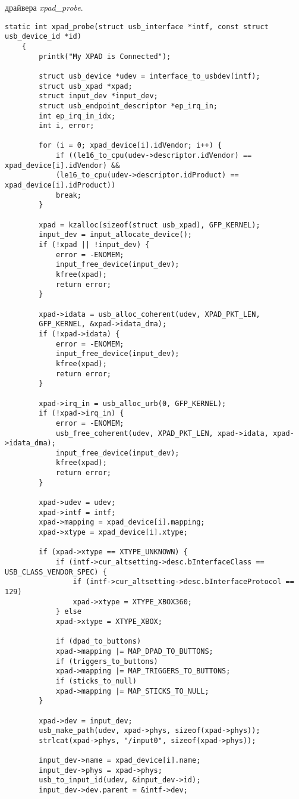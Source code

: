 драйвера \textit{xpad\_probe}.
\begin{lstlisting}[caption=Функция xpad\_probe]
	static int xpad_probe(struct usb_interface *intf, const struct usb_device_id *id)
	{
		printk("My XPAD is Connected");
		
		struct usb_device *udev = interface_to_usbdev(intf);
		struct usb_xpad *xpad;
		struct input_dev *input_dev;
		struct usb_endpoint_descriptor *ep_irq_in;
		int ep_irq_in_idx;
		int i, error;
		
		for (i = 0; xpad_device[i].idVendor; i++) {
			if ((le16_to_cpu(udev->descriptor.idVendor) == xpad_device[i].idVendor) &&
			(le16_to_cpu(udev->descriptor.idProduct) == xpad_device[i].idProduct))
			break;
		}
		
		xpad = kzalloc(sizeof(struct usb_xpad), GFP_KERNEL);
		input_dev = input_allocate_device();
		if (!xpad || !input_dev) {
			error = -ENOMEM;
			input_free_device(input_dev);
			kfree(xpad);
			return error;
		}
		
		xpad->idata = usb_alloc_coherent(udev, XPAD_PKT_LEN,
		GFP_KERNEL, &xpad->idata_dma);
		if (!xpad->idata) {
			error = -ENOMEM;
			input_free_device(input_dev);
			kfree(xpad);
			return error;
		}
		
		xpad->irq_in = usb_alloc_urb(0, GFP_KERNEL);
		if (!xpad->irq_in) {
			error = -ENOMEM;
			usb_free_coherent(udev, XPAD_PKT_LEN, xpad->idata, xpad->idata_dma);
			input_free_device(input_dev);
			kfree(xpad);
			return error;
		}
		
		xpad->udev = udev;
		xpad->intf = intf;
		xpad->mapping = xpad_device[i].mapping;
		xpad->xtype = xpad_device[i].xtype;
		
		if (xpad->xtype == XTYPE_UNKNOWN) {
			if (intf->cur_altsetting->desc.bInterfaceClass == USB_CLASS_VENDOR_SPEC) {
				if (intf->cur_altsetting->desc.bInterfaceProtocol == 129)
				xpad->xtype = XTYPE_XBOX360;
			} else
			xpad->xtype = XTYPE_XBOX;
			
			if (dpad_to_buttons)
			xpad->mapping |= MAP_DPAD_TO_BUTTONS;
			if (triggers_to_buttons)
			xpad->mapping |= MAP_TRIGGERS_TO_BUTTONS;
			if (sticks_to_null)
			xpad->mapping |= MAP_STICKS_TO_NULL;
		}
		
		xpad->dev = input_dev;
		usb_make_path(udev, xpad->phys, sizeof(xpad->phys));
		strlcat(xpad->phys, "/input0", sizeof(xpad->phys));
		
		input_dev->name = xpad_device[i].name;
		input_dev->phys = xpad->phys;
		usb_to_input_id(udev, &input_dev->id);
		input_dev->dev.parent = &intf->dev;
		

\end{lstlisting}

